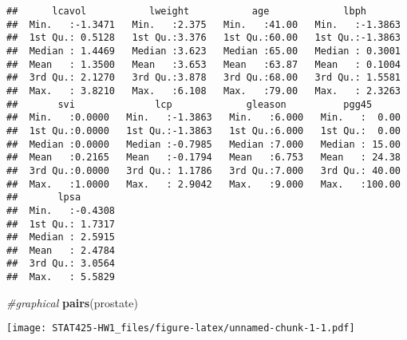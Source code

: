 \documentclass[]{article}
\newenvironment{Shaded}{\begin{snugshade}}{\end{snugshade}}
\newcommand{\KeywordTok}[1]{\textcolor[rgb]{0.13,0.29,0.53}{\textbf{#1}}}
\newcommand{\DataTypeTok}[1]{\textcolor[rgb]{0.13,0.29,0.53}{#1}}
\newcommand{\StringTok}[1]{\textcolor[rgb]{0.31,0.60,0.02}{#1}}
\newcommand{\CommentTok}[1]{\textcolor[rgb]{0.56,0.35,0.01}{\textit{#1}}}
\newcommand{\OperatorTok}[1]{\textcolor[rgb]{0.81,0.36,0.00}{\textbf{#1}}}
\newcommand{\NormalTok}[1]{#1}
\begin{document}
\begin{verbatim}
##      lcavol           lweight           age             lbph        
##  Min.   :-1.3471   Min.   :2.375   Min.   :41.00   Min.   :-1.3863  
##  1st Qu.: 0.5128   1st Qu.:3.376   1st Qu.:60.00   1st Qu.:-1.3863  
##  Median : 1.4469   Median :3.623   Median :65.00   Median : 0.3001  
##  Mean   : 1.3500   Mean   :3.653   Mean   :63.87   Mean   : 0.1004  
##  3rd Qu.: 2.1270   3rd Qu.:3.878   3rd Qu.:68.00   3rd Qu.: 1.5581  
##  Max.   : 3.8210   Max.   :6.108   Max.   :79.00   Max.   : 2.3263  
##       svi              lcp             gleason          pgg45       
##  Min.   :0.0000   Min.   :-1.3863   Min.   :6.000   Min.   :  0.00  
##  1st Qu.:0.0000   1st Qu.:-1.3863   1st Qu.:6.000   1st Qu.:  0.00  
##  Median :0.0000   Median :-0.7985   Median :7.000   Median : 15.00  
##  Mean   :0.2165   Mean   :-0.1794   Mean   :6.753   Mean   : 24.38  
##  3rd Qu.:0.0000   3rd Qu.: 1.1786   3rd Qu.:7.000   3rd Qu.: 40.00  
##  Max.   :1.0000   Max.   : 2.9042   Max.   :9.000   Max.   :100.00  
##       lpsa        
##  Min.   :-0.4308  
##  1st Qu.: 1.7317  
##  Median : 2.5915  
##  Mean   : 2.4784  
##  3rd Qu.: 3.0564  
##  Max.   : 5.5829
\end{verbatim}

\begin{Shaded}
\begin{Highlighting}[]
\CommentTok{#graphical}
\KeywordTok{pairs}\NormalTok{(prostate)}
\end{Highlighting}
\end{Shaded}

\texttt{[image: STAT425-HW1\_files/figure-latex/unnamed-chunk-1-1.pdf]}

\begin{Shaded}
\end{Shaded}
\end{document}

